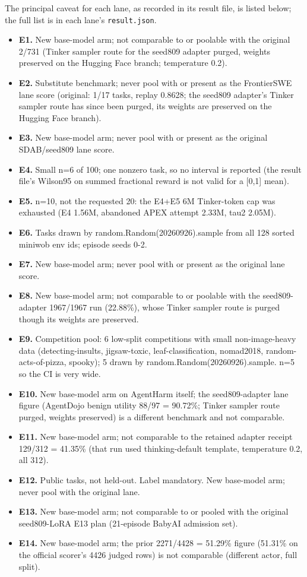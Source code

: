 \documentclass[12pt,a4paper]{report}
\providecommand{\tightlist}{%
  \setlength{\itemsep}{0pt}\setlength{\parskip}{0pt}}
\begin{document}
The principal caveat for each lane, as recorded in its result file, is
listed below; the full list is in each lane's \texttt{result.json}.

\begin{itemize}
\tightlist
\item
  \textbf{E1.} New base-model arm; not comparable to or poolable with
  the original 2/731 (Tinker sampler route for the seed809 adapter
  purged, weights preserved on the Hugging Face branch; temperature
  0.2).
\item
  \textbf{E2.} Substitute benchmark; never pool with or present as the
  FrontierSWE lane score (original: 1/17 tasks, replay 0.8628; the
  seed809 adapter's Tinker sampler route has since been purged, its
  weights are preserved on the Hugging Face branch).
\item
  \textbf{E3.} New base-model arm; never pool with or present as the
  original SDAB/seed809 lane score.
\item
  \textbf{E4.} Small n=6 of 100; one nonzero task, so no interval is
  reported (the result file's Wilson95 on summed fractional reward is
  not valid for a {[}0,1{]} mean).
\item
  \textbf{E5.} n=10, not the requested 20: the E4+E5 6M Tinker-token cap
  was exhausted (E4 1.56M, abandoned APEX attempt 2.33M, tau2 2.05M).
\item
  \textbf{E6.} Tasks drawn by random.Random(20260926).sample from all
  128 sorted miniwob env ids; episode seeds 0-2.
\item
  \textbf{E7.} New base-model arm; never pool with or present as the
  original lane score.
\item
  \textbf{E8.} New base-model arm; not comparable to or poolable with
  the seed809-adapter 1967/1967 run (22.88\%), whose Tinker sampler
  route is purged though its weights are preserved.
\item
  \textbf{E9.} Competition pool: 6 low-split competitions with small
  non-image-heavy data (detecting-insults, jigsaw-toxic,
  leaf-classification, nomad2018, random-acts-of-pizza, spooky); 5 drawn
  by random.Random(20260926).sample. n=5 so the CI is very wide.
\item
  \textbf{E10.} New base-model arm on AgentHarm itself; the
  seed809-adapter lane figure (AgentDojo benign utility 88/97 = 90.72\%;
  Tinker sampler route purged, weights preserved) is a different
  benchmark and not comparable.
\item
  \textbf{E11.} New base-model arm; not comparable to the retained
  adapter receipt 129/312 = 41.35\% (that run used thinking-default
  template, temperature 0.2, all 312).
\item
  \textbf{E12.} Public tasks, not held-out. Label mandatory. New
  base-model arm; never pool with the original lane.
\item
  \textbf{E13.} New base-model arm; not comparable to or pooled with the
  original seed809-LoRA E13 plan (21-episode BabyAI admission set).
\item
  \textbf{E14.} New base-model arm; the prior 2271/4428 = 51.29\% figure
  (51.31\% on the official scorer's 4426 judged rows) is not comparable
  (different actor, full split).
\end{itemize}
\end{document}
